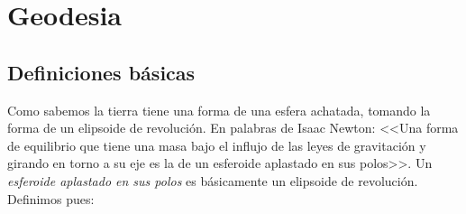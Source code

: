 
\chapter{Geodesia}


\section{Definiciones básicas}

Como sabemos la tierra tiene una forma de una esfera achatada, tomando la forma de un elipsoide de revolución. En palabras de Isaac Newton: <<Una forma de equilibrio que tiene una masa bajo el influjo de las leyes de gravitación y girando en torno a su eje es la de un esferoide aplastado en sus polos>>. Un \textit{esferoide aplastado en sus polos} es básicamente un elipsoide de revolución. Definimos pues:



